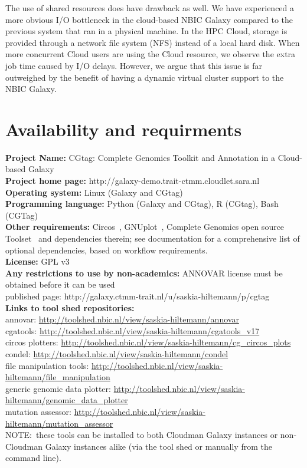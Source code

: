 The use of shared resources does have drawback as well. We have experienced a more obvious I/O bottleneck in the cloud-based NBIC Galaxy compared to the previous system that ran in a physical machine. In the HPC Cloud, storage is provided through a network file system (NFS) instead of a local hard disk. When more concurrent Cloud users are using the Cloud resource, we observe the extra job time caused by I/O delays. However, we argue that this issue is far outweighed by the benefit of having a dynamic virtual cluster support to the NBIC Galaxy.


\section*{Availability and requirments}

\textbf{Project Name:} CGtag: Complete Genomics Toolkit and Annotation in a Cloud-based Galaxy\\
\textbf{Project home page:} http://galaxy-demo.trait-ctmm.cloudlet.sara.nl\\
\textbf{Operating system:} Linux (Galaxy and CGtag)\\
\textbf{Programming language:} Python (Galaxy and CGtag), R (CGtag), Bash (CGTag) \\
\textbf{Other requirements:} Circos~\cite{url-circos}, GNUplot~\cite{url-gnuplot}, Complete Genomics open source Toolset~\cite{url-cgatools}  and dependencies therein; see documentation for a comprehensive list of optional dependencies, based on workflow requirements.\\
\textbf{License:} GPL v3\\
\textbf{Any restrictions to use by non-academics:} ANNOVAR license must be obtained before it can be used\\
published page: http://galaxy.ctmm-trait.nl/u/saskia-hiltemann/p/cgtag \\
\textbf{Links to tool shed repositories:}\\
annovar: \url{http://toolshed.nbic.nl/view/saskia-hiltemann/annovar} \\
cgatools: \url{http://toolshed.nbic.nl/view/saskia-hiltemann/cgatools\_v17} \\
circos plotters: \url{http://toolshed.nbic.nl/view/saskia-hiltemann/cg\_circos\_plots} \\
condel: \url{http://toolshed.nbic.nl/view/saskia-hiltemann/condel} \\
file manipulation tools: \url{http://toolshed.nbic.nl/view/saskia-hiltemann/file\_manipulation} \\
generic genomic data plotter: \url{http://toolshed.nbic.nl/view/saskia-hiltemann/genomic\_data\_plotter} \\
mutation assessor: \url{http://toolshed.nbic.nl/view/saskia-hiltemann/mutation\_assessor}\\
NOTE:\ these tools can be installed to both Cloudman Galaxy instances or non-Cloudman Galaxy instances alike (via the tool shed or manually from the command line).

